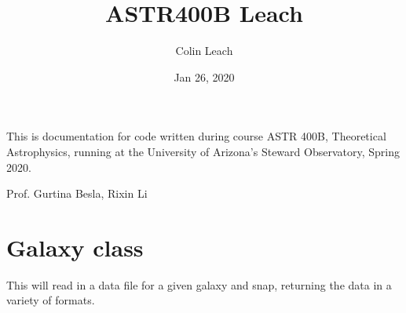 \documentclass[letterpaper,10pt,english]{sphinxmanual}
\title{ASTR400B Leach}
\date{Jan 26, 2020}
\author{Colin Leach}
\begin{document}
\pagestyle{empty}
\sphinxmaketitle
\pagestyle{plain}
\sphinxtableofcontents
\pagestyle{normal}
\label{\detokenize{index::doc}}


This is documentation for code written during course ASTR 400B,
Theoretical Astrophysics, running at the University of Arizona’s
Steward Observatory, Spring 2020.

 Prof. Gurtina Besla,   Rixin Li

 
\label{\detokenize{galaxy:module-galaxy.galaxy}}

\chapter{Galaxy class}
\label{\detokenize{galaxy:galaxy-class}}\label{\detokenize{galaxy::doc}}
This will read in a data file for a given galaxy and snap, returning the
data in a variety of formats.
\end{document}
